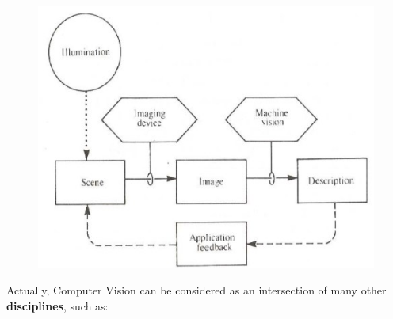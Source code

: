 \begin{figure}[h!]
		\centering
		\includegraphics[scale = 1.5]{img/cv.jpg}
\end{figure}

Actually, Computer Vision can be considered as an intersection of many other \textbf{disciplines}, such as:

